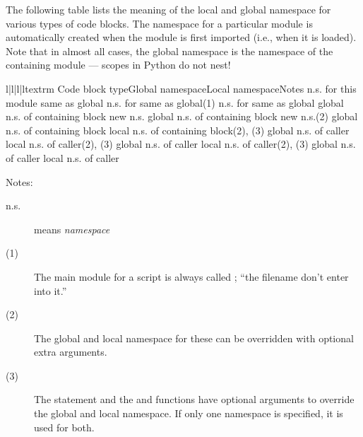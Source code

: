 The following table lists the meaning of the local and global
namespace for various types of code blocks.  The namespace for a
particular module is automatically created when the module is first
imported (i.e., when it is loaded).  Note that in almost all cases,
the global namespace is the namespace of the containing module ---
scopes in Python do not nest!

\begin{tableiv}{l|l|l|l}{textrm}
  {Code block type}{Global namespace}{Local namespace}{Notes}
         {n.s. for this module}
         {same as global}{}
         {n.s. for }
         {same as global}{(1)}
         {n.s. for }
         {same as global}{}
         {global n.s. of containing block}
         {new n.s.}{}
         {global n.s. of containing block}
         {new n.s.}{(2)}
         {global n.s. of containing block}
         {local n.s. of containing block}{(2), (3)}
         {global n.s. of caller}
         {local n.s. of caller}{(2), (3)}
         {global n.s. of caller}
         {local n.s. of caller}{(2), (3)}
         {global n.s. of caller}
         {local n.s. of caller}{}
\end{tableiv}

Notes:

\begin{description}

\item[n.s.] means \emph{namespace}

\item[(1)] The main module for a script is always called
; ``the filename don't enter into it.''

\item[(2)] The global and local namespace for these can be
overridden with optional extra arguments.

\item[(3)] The  statement and the  and
 functions have optional arguments to override
the global and local namespace.  If only one namespace is specified,
it is used for both.

\end{description}

